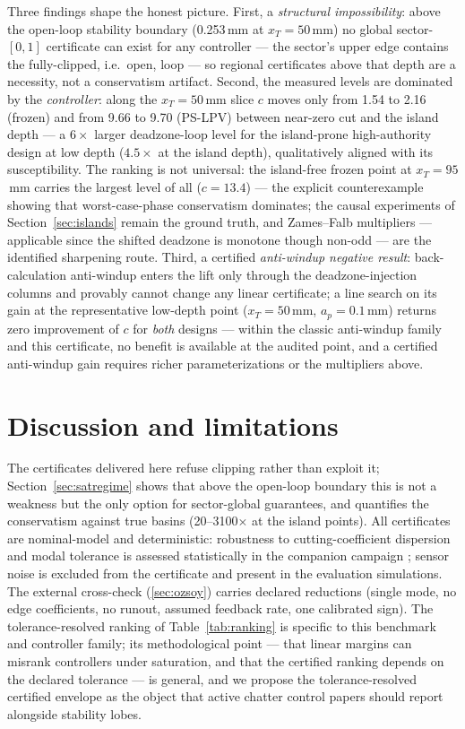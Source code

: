 \documentclass[preprint,12pt]{elsarticle}
\begin{document}
Three findings shape the honest picture. First, a \emph{structural
impossibility}: above the open-loop stability boundary (0.253\,mm at
$x_T=50$\,mm) no global sector-$[0,1]$ certificate can exist for any
controller --- the sector's upper edge contains the fully-clipped,
i.e.\ open, loop --- so regional certificates above that depth are a
necessity, not a conservatism artifact. Second, the measured levels
are dominated by the \emph{controller}: along the $x_T=50$\,mm slice
$c$ moves only from 1.54 to 2.16 (frozen) and from 9.66 to 9.70
(PS-LPV) between near-zero cut and the island depth --- a $6\times$
larger deadzone-loop level for the island-prone high-authority design
at low depth ($4.5\times$ at the island depth), qualitatively aligned
with its susceptibility. The ranking is not universal: the island-free
frozen point at $x_T=95$\,mm carries the largest level of all
($c=13.4$) --- the explicit counterexample showing that
worst-case-phase conservatism dominates; the causal experiments of
Section~\ref{sec:islands} remain the ground truth, and Zames--Falb
multipliers --- applicable since the shifted deadzone is monotone
though non-odd --- are the identified sharpening route. Third, a
certified \emph{anti-windup negative result}: back-calculation
anti-windup enters the lift only through the deadzone-injection
columns and provably cannot change any linear certificate; a line
search on its gain at the representative low-depth point
($x_T=50$\,mm, $a_p=0.1$\,mm) returns zero improvement of $c$ for
\emph{both} designs --- within the classic anti-windup family and
this certificate, no benefit is available at the audited point, and a
certified anti-windup gain requires richer parameterizations or the
multipliers above.

\section{Discussion and limitations}
\label{sec:discussion}

The certificates delivered here refuse clipping rather than exploit
it; Section~\ref{sec:satregime} shows that above the open-loop
boundary this is not a weakness but the only option for
sector-global guarantees, and quantifies the conservatism against
true basins (20--3100$\times$ at the island points). All certificates
are nominal-model and deterministic: robustness to
cutting-coefficient dispersion and modal tolerance is assessed
statistically in the companion campaign \cite{companion}; sensor
noise is excluded from the certificate and present in the evaluation
simulations. The external cross-check (\ref{sec:ozsoy}) carries declared reductions
(single mode, no edge coefficients, no runout, assumed feedback
rate, one calibrated sign). The tolerance-resolved ranking of
Table~\ref{tab:ranking} is specific to this benchmark and controller
family; its methodological point --- that linear margins can misrank
controllers under saturation, and that the certified ranking depends
on the declared tolerance --- is general, and we propose the
tolerance-resolved certified envelope as the object that active
chatter control papers should report alongside stability lobes.
\end{document}

